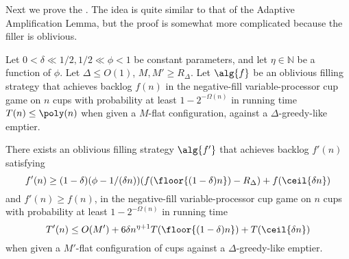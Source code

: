 Next we prove the . The idea
is quite similar to that of the Adaptive Amplification Lemma, but the 
proof is somewhat more complicated because the filler is oblivious.
\begin{lemma}
  \label{lem:obliviousAmplification} 
  Let $0 < \delta \ll 1/2, 1/2\ll \phi < 1$ be constant
  parameters, and let $\eta \in \mathbb{N}$ be a function of $\phi$. 
  Let $\Delta \le O(1)$, $M, M' \ge R_\Delta$. 
  Let $\alg{f}$ be an oblivious filling strategy that achieves
  backlog $f(n)$ in the negative-fill variable-processor cup game
  on $n$ cups with probability at least $1-2^{-\Omega(n)}$ in
  running time $T(n) \le \poly(n)$ when given a $M$-flat
  configuration, against a $\Delta$-greedy-like emptier.

  There exists an oblivious filling strategy $\alg{f'}$ that
  achieves backlog $f'(n)$ satisfying 
  $$f'(n) \ge (1-\delta)(\phi-1/(\delta n)) (f(\floor{(1-\delta)n})-R_\Delta) + f(\ceil{\delta n})$$ 
  and $f'(n) \ge f(n)$, in the negative-fill
  variable-processor cup game on $n$ cups with probability at
  least $1-2^{-\Omega(n)}$ in running time $$T'(n) \le O(M') +
  6 \delta n^{\eta+1} T(\floor{(1-\delta)n}) + T(\ceil{\delta n})$$
  when given a $M'$-flat configuration of cups against a
  $\Delta$-greedy-like emptier.
\end{lemma}
